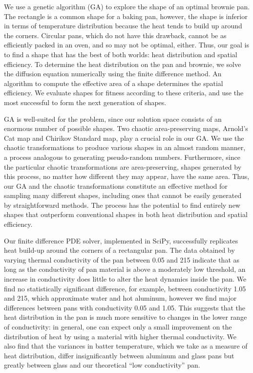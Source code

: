 \documentclass[12pt]{reedmcm}
\begin{document}
\begin{summary}
  \quad\: We use a genetic algorithm (GA) to explore the shape of an optimal brownie pan.
  The rectangle is a common shape for a baking pan, however, the shape is inferior in terms of temperature distribution because the heat tends to build up around the corners.
  Circular pans, which do not have this drawback, cannot be as efficiently packed in an oven, and so may not be optimal, either. 
  Thus, our goal is to find a shape that has the best of both worlds: heat distribution and spatial efficiency.
  To determine the heat distribution on the pan and brownie, we solve the diffusion equation numerically using the finite difference method.
  An algorithm to compute the effective area of a shape determines the spatial efficiency.
  We evaluate shapes for fitness according to these criteria, and use the most successful to form the next generation of shapes.

  GA is well-suited for the problem, since our solution space consists of an enormous number of possible shapes.
  Two chaotic area-preserving maps, Arnold's Cat map and Chirikov Standard map, play a crucial role in our GA.
  We use the chaotic transformations to produce various shapes in an almost random manner, a process analogous to generating pseudo-random numbers.
  Furthermore, since the particular chaotic transformations are area-preserving, shapes generated by this process, no matter how different they may appear, have the same area.  
  Thus, our GA and the chaotic transformations constitute an effective method for sampling many different shapes, including ones that cannot be easily generated by straightforward methods.
  The process has the potential to find entirely new shapes that outperform conventional shapes in both heat distribution and spatial efficiency.

  Our finite difference PDE solver, implemented in SciPy, successfully replicates heat build-up around the corners of a rectangular pan.
  The data obtained by varying thermal conductivity of the pan between 0.05 and 215 indicate that as long as the conductivity of pan material is above a moderately low threshold, an increase in conductivity does little to alter the heat dynamics inside the pan.
  We find no statistically significant difference, for example, between conductivity 1.05 and 215, which approximate water and hot aluminum, however we find major differences between pans with conductivity 0.05 and 1.05.
  This suggests that the heat distribution in the pan is much more sensitive to changes in the lower range of conductivity: in general, one can expect only a small improvement on the distribution of heat by using a material with higher thermal conductivity.
  We also find that the variances in batter temperature, which we take as a measure of heat distribution, differ insignificantly between aluminum and glass pans but greatly between glass and our theoretical ``low conductivity'' pan.
\end{summary}
\end{document}
